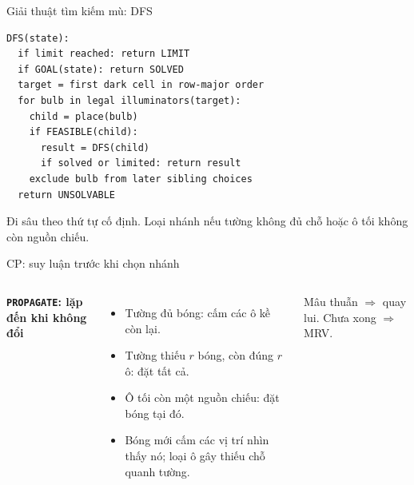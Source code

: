 \begin{frame}[fragile]{Giải thuật tìm kiếm mù: DFS}
\begin{lstlisting}[breaklines=true]
DFS(state):
  if limit reached: return LIMIT
  if GOAL(state): return SOLVED
  target = first dark cell in row-major order
  for bulb in legal illuminators(target):
    child = place(bulb)
    if FEASIBLE(child):
      result = DFS(child)
      if solved or limited: return result
    exclude bulb from later sibling choices
  return UNSOLVABLE
\end{lstlisting}
\small Đi sâu theo thứ tự cố định. Loại nhánh nếu tường không đủ chỗ hoặc ô tối không còn nguồn chiếu.
\end{frame}

\begin{frame}{CP: suy luận trước khi chọn nhánh}
\begin{columns}[c,onlytextwidth]
\centering
{}\par{}
\small
\textbf{\texttt{PROPAGATE}: lặp đến khi không đổi}
\begin{itemize}
\item Tường đủ bóng: cấm các ô kề còn lại.
\item Tường thiếu $r$ bóng, còn đúng $r$ ô: đặt tất cả.
\item Ô tối còn một nguồn chiếu: đặt bóng tại đó.
\item Bóng mới cấm các vị trí nhìn thấy nó; loại ô gây thiếu chỗ quanh tường.
\end{itemize}
\vspace{2mm}Mâu thuẫn $\Rightarrow$ quay lui. Chưa xong $\Rightarrow$ MRV.
\end{columns}
\end{frame}

